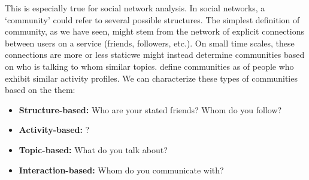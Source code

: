 This is especially true for social network analysis. In \DIFdelbegin {}\DIFdelend social networks, a `community' could refer to several possible structures. The simplest definition of community, as we have seen, might stem from the network of explicit connections between users on a service (friends, followers, etc.). On small time scales, these connections are more or less static\DIFdelbegin {}\DIFdelend \DIFaddbegin {}\DIFaddend we might instead determine communities based on who is talking to whom \DIFdelbegin {}\DIFdelend \DIFaddbegin {}\DIFaddend similar topics.
\DIFdelbegin {}\DIFdelend \DIFaddbegin {}\DIFaddend define communities as \DIFdelbegin {}\DIFdelend \DIFaddbegin {}\DIFaddend of people who exhibit similar activity profiles\DIFdelbegin {}\DIFdelend . We can characterize these types of communities based on the \DIFdelbegin {}\DIFdelend \DIFaddbegin {}\DIFaddend them:
\begin{itemize}
	\item \textbf{Structure-based:} Who are your stated friends? Whom do you follow?
	\item \textbf{Activity-based:} \DIFdelbegin {}\DIFdelend \DIFaddbegin {}\DIFaddend ?
	\item \textbf{Topic-based:} What do you talk about?
	\item \textbf{Interaction-based:} Whom do you communicate with?
\end{itemize}


